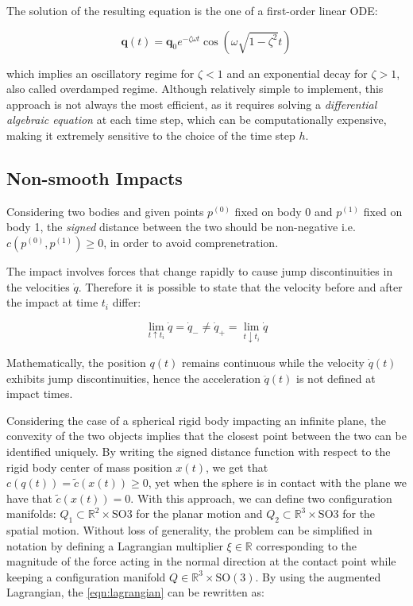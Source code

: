 The solution of the resulting equation is the one of a first-order linear \ac{ODE}:

\begin{equation}
    \mathbf{q}(t) = \mathbf{q}_0 e^{-\zeta \omega t} \cos(\omega \sqrt{1 - \zeta ^2} t)
\end{equation}

which implies an oscillatory regime for $\zeta < 1$ and an exponential decay for $\zeta > 1$, also called overdamped regime.
Although relatively simple to implement, this approach is not always the most efficient, as it requires solving a \textit{differential algebraic equation} at each time step, which can be computationally expensive, making it extremely sensitive to the choice of the time step $h$.

\subsection{Non-smooth Impacts}

Considering two bodies and given points $p ^{(0)}$ fixed on body 0 and $p ^{(1)}$ fixed on body 1, the \textit{signed} distance between the two should be non-negative i.e. $c(p ^{(0)}, p ^{(1)}) \geq 0$, in order to avoid comprenetration.

The impact involves forces that change rapidly to cause jump discontinuities in the velocities $\dot{q}$. Therefore it is possible to state that the velocity before and after the impact at time $t_i$ differ:

\begin{equation}
    \lim _{t \uparrow t _i} \dot{q} = \dot{q} _{-} \neq \dot{q} _{+} = \lim _{t \downarrow t _i} \dot{q}
\end{equation}

Mathematically, the position $q(t)$ remains continuous while the velocity $\dot{q}(t)$ exhibits jump discontinuities, hence the acceleration $\ddot{q}(t)$ is not defined at impact times.

Considering the case of a spherical rigid body impacting an infinite plane, the convexity of the two objects implies that the closest point between the two can be identified uniquely. By writing the signed distance function with respect to the rigid body center of mass position $x(t)$, we get that $c(q(t)) = \tilde{c}(x(t)) \geq 0$, yet when the sphere is in contact with the plane we have that $\tilde{c}(x(t)) = 0$. With this approach, we can define two configuration manifolds: $Q _1 \subset \mathbb{R} ^2 \times \mathrm{SO}3$ for the planar motion and $Q _2 \subset \mathbb{R} ^3 \times \mathrm{SO}3$ for the spatial motion. Without loss of generality, the problem can be simplified in notation by defining a Lagrangian multiplier $\xi \in \mathbb{R}$ corresponding to the magnitude of the force acting in the normal direction at the contact point while keeping a configuration manifold $Q \in \mathbb{R}^3 \times \mathrm{SO}(3)$.
By using the augmented Lagrangian, the \cref{eqn:lagrangian} can be rewritten as:

